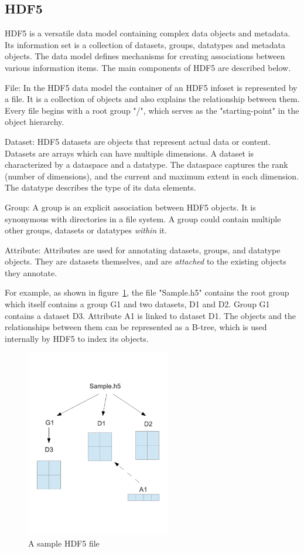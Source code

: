 \subsection{HDF5}
HDF5 is a versatile data model containing complex data objects and metadata. 
Its information set is a collection of datasets, groups, datatypes and metadata objects. The data model defines mechanisms for creating associations between various information items. The main components of HDF5 are described below.

File:
In the HDF5 data model the container of an HDF5 infoset
is represented by a file. It is a collection of objects and also explains the relationship between them.
Every file begins with a root group "/", which serves as the "starting-point" in the object hierarchy. 

Dataset:
HDF5 datasets are objects that represent actual data or content. Datasets are arrays which can have multiple dimensions. A dataset is characterized by a dataspace and a datatype. The dataspace captures the rank (number of dimensions), and the current and maximum extent in each dimension. The datatype describes the type of its data elements. 

Group:
A group is an explicit association between HDF5 objects. It is synonymous with directories in a file system. A group could contain multiple other groups, datasets or datatypes \textit{within} it. 

Attribute:
Attributes are used for annotating datasets, groups, and datatype objects. They are datasets themselves, and are \textit{attached} to the existing objects they annotate. 

For example, as shown in figure~\ref{hdf5_example}, the file "Sample.h5" contains the root group which itself contains a group G1 and two datasets, D1 and D2. Group G1 contains a dataset D3. Attribute A1 is linked to dataset D1. The objects and the relationships between them can be represented as a B-tree, which is used internally by HDF5 to index its objects. 

\begin{figure}[!t]
\centering
\includegraphics[width=2.5in]{hdf5_example}
\caption{A sample HDF5 file}
\label{hdf5_example}
\end{figure}

